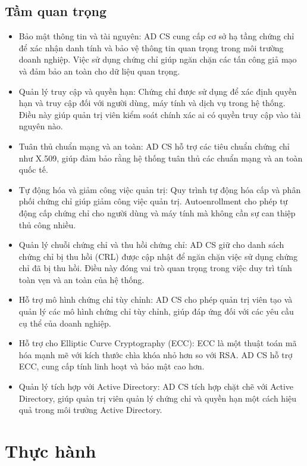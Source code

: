 \documentclass[13pt]{report}
\begin{document}
	\section{Tầm quan trọng}
	\begin{itemize}
		\item Bảo mật thông tin và tài nguyên: AD CS cung cấp cơ sở hạ tầng chứng chỉ để xác nhận danh tính và bảo vệ thông tin quan trọng trong môi trường doanh nghiệp. Việc sử dụng chứng chỉ giúp ngăn chặn các tấn công giả mạo và đảm bảo an toàn cho dữ liệu quan trọng.
		\item Quản lý truy cập và quyền hạn:
		Chứng chỉ được sử dụng để xác định quyền hạn và truy cập đối với người dùng, máy tính và dịch vụ trong hệ thống. Điều này giúp quản trị viên kiểm soát chính xác ai có quyền truy cập vào tài nguyên nào.
		\item Tuân thủ chuẩn mạng và an toàn:
		AD CS hỗ trợ các tiêu chuẩn chứng chỉ như X.509, giúp đảm bảo rằng hệ thống tuân thủ các chuẩn mạng và an toàn quốc tế.
		\item Tự động hóa và giảm công việc quản trị:
		Quy trình tự động hóa cấp và phân phối chứng chỉ giúp giảm công việc quản trị. Autoenrollment cho phép tự động cấp chứng chỉ cho người dùng và máy tính mà không cần sự can thiệp thủ công nhiều.
		\item Quản lý chuỗi chứng chỉ và thu hồi chứng chỉ:
		AD CS giữ cho danh sách chứng chỉ bị thu hồi (CRL) được cập nhật để ngăn chặn việc sử dụng chứng chỉ đã bị thu hồi. Điều này đóng vai trò quan trọng trong việc duy trì tính toàn vẹn và an toàn của hệ thống.
		\item Hỗ trợ mô hình chứng chỉ tùy chỉnh:
		AD CS cho phép quản trị viên tạo và quản lý các mô hình chứng chỉ tùy chỉnh, giúp đáp ứng đối với các yêu cầu cụ thể của doanh nghiệp.
		\item Hỗ trợ cho Elliptic Curve Cryptography (ECC):
		ECC là một thuật toán mã hóa mạnh mẽ với kích thước chìa khóa nhỏ hơn so với RSA. AD CS hỗ trợ ECC, cung cấp tính linh hoạt và bảo mật cao hơn.
		\item Quản lý tích hợp với Active Directory:
		AD CS tích hợp chặt chẽ với Active Directory, giúp quản trị viên quản lý chứng chỉ và quyền hạn một cách hiệu quả trong môi trường Active Directory.
	\end{itemize}
	\newpage
	\chapter{Thực hành}
\end{document}
